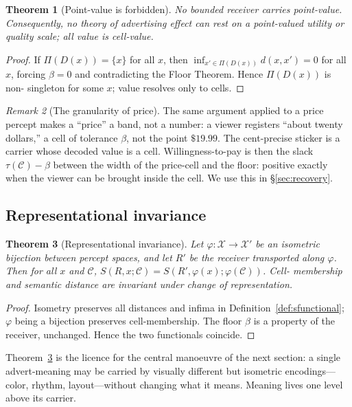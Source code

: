 \documentclass[twocolumn,11pt,a4paper]{article}
\theoremstyle{adv}
\newtheorem{theorem}{Theorem}[section]
\theoremstyle{definition}
\theoremstyle{remark}
\newtheorem{remark}[theorem]{Remark}
\newcommand{\Out}{\mathcal{X}}         %
\newcommand{\Cell}{\mathcal{C}}        %
\newcommand{\Dec}{D}                   %
\newcommand{\Proj}{\Pi}                %
\newcommand{\Recv}{R}                  %
\newcommand{\Sval}{S}                  %
\newcommand{\floor}{\beta}            %
\newcommand{\tol}{\tau}               %
\newcommand{\dist}{d}
\begin{document}
\begin{theorem}[Point-value is forbidden]
\label{thm:nopoint}
No bounded receiver carries point-value. Consequently, no theory of
advertising effect can rest on a point-valued utility or quality scale;
all value is cell-value.
\end{theorem}

\begin{proof}
If $\Proj(\Dec(x))=\{x\}$ for all $x$, then
$\inf_{x'\in\Proj(\Dec(x))}\dist(x,x')=0$ for all $x$, forcing $\floor=0$
and contradicting the Floor Theorem. Hence $\Proj(\Dec(x))$ is non-
singleton for some $x$; value resolves only to cells.
\end{proof}

\begin{remark}[The granularity of price]
\label{rem:price}
The same argument applied to a price percept makes a ``price'' a band, not
a number: a viewer registers ``about twenty dollars,'' a cell of tolerance
$\floor$, not the point $\$19.99$. The cent-precise sticker is a carrier
whose decoded value is a cell. Willingness-to-pay is then the slack
$\tol(\Cell)-\floor$ between the width of the price-cell and the floor:
positive exactly when the viewer can be brought inside the cell. We use
this in \S\ref{sec:recovery}.
\end{remark}

\subsection{Representational invariance}

\begin{theorem}[Representational invariance]
\label{thm:repinv}
Let $\varphi:\Out\to\Out'$ be an isometric bijection between percept
spaces, and let $\Recv'$ be the receiver transported along $\varphi$. Then
for all $x$ and $\Cell$,
$\Sval(\Recv,x;\Cell)=\Sval(\Recv',\varphi(x);\varphi(\Cell))$. Cell-
membership and semantic distance are invariant under change of
representation.
\end{theorem}

\begin{proof}
Isometry preserves all distances and infima in
Definition~\ref{def:sfunctional}; $\varphi$ being a bijection preserves
cell-membership. The floor $\floor$ is a property of the receiver,
unchanged. Hence the two functionals coincide.
\end{proof}

Theorem~\ref{thm:repinv} is the licence for the central manoeuvre of the
next section: a single advert-meaning may be carried by visually different
but isometric encodings---color, rhythm, layout---without changing what it
means. Meaning lives one level above its carrier.
\end{document}
